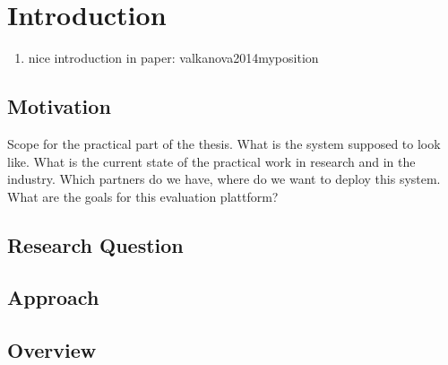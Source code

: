 \section{Introduction}



\begin{enumerate}
\item nice introduction in paper: valkanova2014myposition
\end{enumerate}



\subsection{Motivation}

Scope for the practical part of the thesis. What is the system supposed to look like. What is the current state of the practical work in research and in the industry. Which partners do we have, where do we want to deploy this system. What are the goals for this evaluation plattform?




\subsection{Research Question}



\subsection{Approach}



\subsection{Overview}











